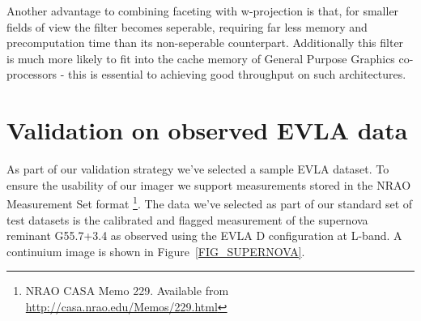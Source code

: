 \documentclass[a4paper,10pt]{article}
\begin{document}
Another advantage to combining faceting with w-projection is that, for smaller fields of view the filter becomes seperable, requiring far
less memory and precomputation time than its non-seperable counterpart. Additionally this filter is much more likely to fit into the cache memory
of General Purpose Graphics co-processors - this is essential to achieving good throughput on such architectures.
\section{Validation on observed EVLA data}
As part of our validation strategy we've selected a sample EVLA dataset. To ensure the usability of our imager
we support measurements stored in the NRAO Measurement Set format \footnote{NRAO CASA Memo 229. Available from \url{http://casa.nrao.edu/Memos/229.html}}.
The data we've selected as part of our standard set of test datasets is the calibrated and flagged measurement of the supernova
reminant G55.7+3.4 as observed using the EVLA D configuration at L-band. A continuium image is shown in Figure~\ref{FIG_SUPERNOVA}.
\end{document}
